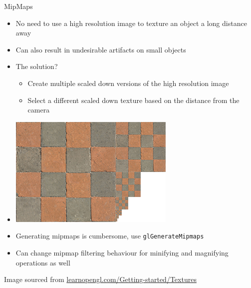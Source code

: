 \documentclass{beamer}
\begin{document}
\begin{frame}[fragile]{MipMaps}
    \begin{itemize}
        \item No need to use a high resolution image to texture an object a long distance away
        \item Can also result in undesirable artifacts on small objects
        \item The solution?
        \begin{itemize}
            \item Create multiple scaled down versions of the high resolution image
            \item Select a different scaled down texture based on the distance from the camera
        \end{itemize}
        \item[] \begin{center}\includegraphics[width=0.40\textheight]{images/mipmaps.png}\end{center}
        \item Generating mipmaps is cumbersome, use {\color{blue}\verb"glGenerateMipmaps"}
        \item Can change mipmap filtering behaviour for minifying and magnifying operations as well
    \end{itemize}
    \vfill{}
    {\footnotesize{Image sourced from \url{learnopengl.com/Getting-started/Textures}}}
\end{frame}
\end{document}
